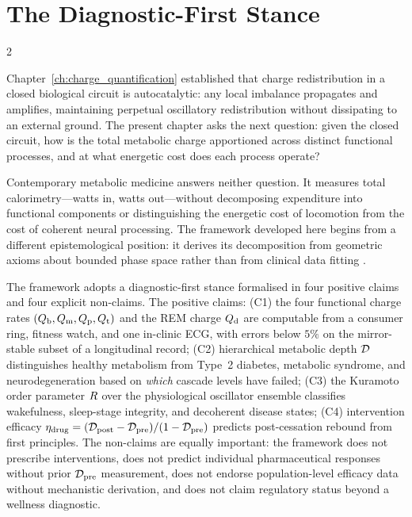 \section{The Diagnostic-First Stance}
\label{sec:ch08-intro}

\begin{multicols}{2}

Chapter~\ref{ch:charge_quantification} established that charge redistribution in a closed biological circuit is autocatalytic: any local imbalance propagates and amplifies, maintaining perpetual oscillatory redistribution without dissipating to an external ground. The present chapter asks the next question: given the closed circuit, how is the total metabolic charge apportioned across distinct functional processes, and at what energetic cost does each process operate?

Contemporary metabolic medicine answers neither question. It measures total calorimetry---watts in, watts out---without decomposing expenditure into functional components or distinguishing the energetic cost of locomotion from the cost of coherent neural processing. The framework developed here begins from a different epistemological position: it derives its decomposition from geometric axioms about bounded phase space rather than from clinical data fitting \citep{sachikonye2024_partitioned}.

The framework adopts a diagnostic-first stance formalised in four positive claims and four explicit non-claims. The positive claims: (C1) the four functional charge rates $(Q_{\mathrm{b}}, Q_{\mathrm{m}}, Q_{\mathrm{p}}, Q_{\mathrm{t}})$ and the REM charge $Q_{\mathrm{d}}$ are computable from a consumer ring, fitness watch, and one in-clinic ECG, with errors below $5\%$ on the mirror-stable subset of a longitudinal record; (C2) hierarchical metabolic depth $\mathcal{D}$ distinguishes healthy metabolism from Type~2 diabetes, metabolic syndrome, and neurodegeneration based on \emph{which} cascade levels have failed; (C3) the Kuramoto order parameter $R$ over the physiological oscillator ensemble classifies wakefulness, sleep-stage integrity, and decoherent disease states; (C4) intervention efficacy $\eta_{\mathrm{drug}} = (\mathcal{D}_{\mathrm{post}} - \mathcal{D}_{\mathrm{pre}})/(1 - \mathcal{D}_{\mathrm{pre}})$ predicts post-cessation rebound from first principles. The non-claims are equally important: the framework does not prescribe interventions, does not predict individual pharmaceutical responses without prior $\mathcal{D}_{\mathrm{pre}}$ measurement, does not endorse population-level efficacy data without mechanistic derivation, and does not claim regulatory status beyond a wellness diagnostic.


\end{multicols}
